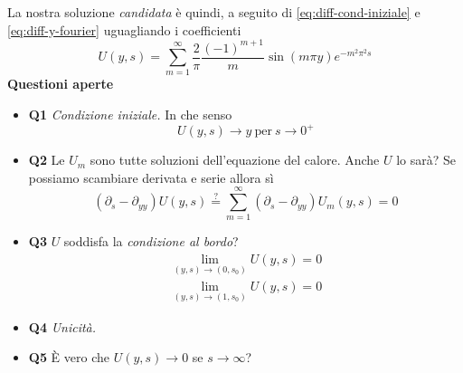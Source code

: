 \documentclass[10pt,a4paper,twoside,openright]{book}
\begin{document}
La nostra soluzione \textit{candidata} è quindi, a seguito di \eqref{eq:diff-cond-iniziale} e \eqref{eq:diff-y-fourier} uguagliando i coefficienti
\begin{equation}
\boxed{U(y,s) =\sum\limits ^{\infty }_{m=1}\frac{2}{\pi }\frac{(-1)^{m+1}}{m}\sin(m\pi y) e^{-m^{2} \pi ^{2} s}}
\label{eq:diff-candidata}
\end{equation}
\textbf{Questioni aperte}
\begin{itemize}
\item \textbf{Q1} \textit{Condizione iniziale.} In che senso\begin{equation*}
U(y,s)\rightarrow y\ \text{per} \ s\rightarrow 0^{+}
\end{equation*}
\item \textbf{Q2} Le $U_{m}$ sono tutte soluzioni dell'equazione del calore. Anche $U$ lo sarà? Se possiamo scambiare derivata e serie allora sì\begin{equation*}
( \partial _{s} -\partial _{yy}) U(y,s)\overset{?}{=}\sum ^{\infty }_{m=1}( \partial _{s} -\partial _{yy}) U_{m} (y,s)=0
\end{equation*}
\item \textbf{Q3} $U$ soddisfa la \textit{condizione al bordo}?\begin{gather*}
\lim\limits _{(y,s)\rightarrow (0,s_{0})} U(y,s) =0\\
\lim\limits _{(y,s)\rightarrow (1,s_{0})} U(y,s) =0
\end{gather*}
\item \textbf{Q4} \textit{Unicità.}
\item \textbf{Q5} È vero che $U(y,s)\rightarrow 0$ se $s\rightarrow \infty $?
\end{itemize}
\end{document}
